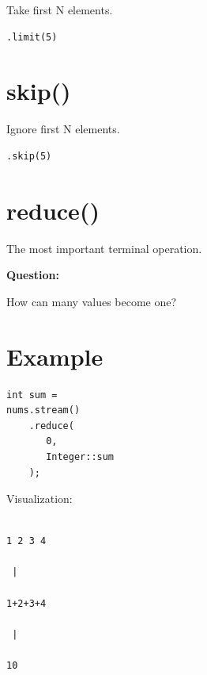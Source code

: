 \documentclass[11pt,a4paper]{book}
\begin{document}
Take first N elements.


\begin{verbatim} 
.limit(5)
\end{verbatim}


\section{skip()}

Ignore first N elements.


\begin{verbatim} 
.skip(5)
\end{verbatim}


\section{reduce()}

The most important terminal operation.


\textbf{Question:}


How can many values become one?


\section{Example}

\begin{verbatim} 
int sum =
nums.stream()
    .reduce(
       0,
       Integer::sum
    );
\end{verbatim}


Visualization:

\begin{verbatim}

1 2 3 4

 |

1+2+3+4

 |

10

\end{verbatim}
\end{document}
